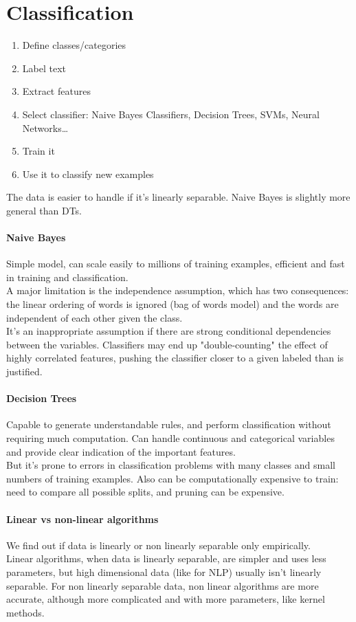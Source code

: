 \documentclass[10pt]{report}
\begin{document}
\section{Classification}
\begin{enumerate}
	\item Define classes/categories
	\item Label text
	\item Extract features
	\item Select classifier: Naive Bayes Classifiers, Decision Trees, SVMs, Neural Networks\ldots
	\item Train it
	\item Use it to classify new examples
\end{enumerate}
The data is easier to handle if it's linearly separable. Naive Bayes is slightly more general than DTs.
\paragraph{Naive Bayes} Simple model, can scale easily to millions of training examples, efficient and fast in training and classification.\\
A major limitation is the independence assumption, which has two consequences: the linear ordering of words is ignored (bag of words model) and the words are independent of each other given the class.\\
It's an inappropriate assumption if there are strong conditional dependencies between the variables. Classifiers may end up "double-counting" the effect of highly correlated features, pushing the classifier closer to a given labeled than is justified.
\paragraph{Decision Trees} Capable to generate understandable rules, and perform classification without requiring much computation. Can handle continuous and categorical variables and provide clear indication of the important features.\\
But it's prone to errors in classification problems with many classes and small numbers of training examples. Also can be computationally expensive to train: need to compare all possible splits, and pruning can be expensive.
\paragraph{Linear vs non-linear algorithms} We find out if data is linearly or non linearly separable only empirically.\\
Linear algorithms, when data is linearly separable, are simpler and uses less parameters, but high dimensional data (like for NLP) usually isn't linearly separable. For non linearly separable data, non linear algorithms are more accurate, although more complicated and with more parameters, like kernel methods.
\end{document}
